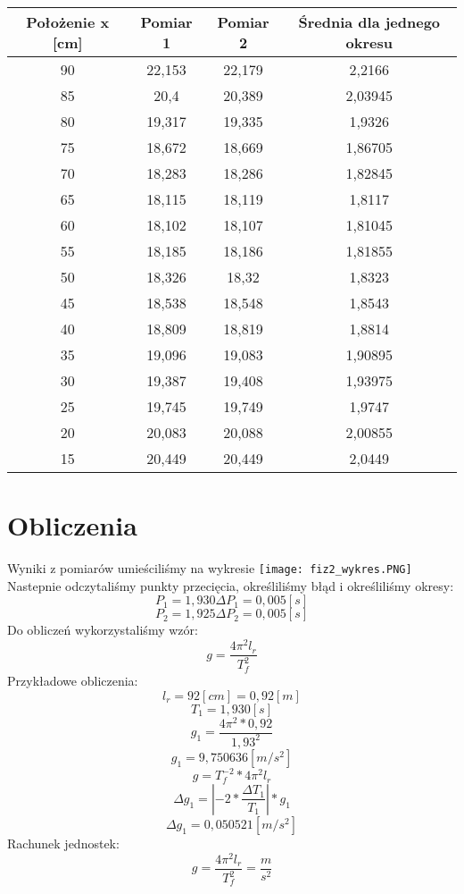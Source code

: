 \documentclass[polish,a4paper]{article}
\begin{document}
\begin{table}[H]
\centering
\begin{tabular}{|c|c|c|c|}
\hline
Położenie x [cm] & Pomiar 1 & Pomiar 2 & Średnia dla jednego okresu\\
\hline 
90 &	22,153 &	22,179 &	2,2166\\
85 &	20,4 &	20,389	 & 2,03945\\
80 &	19,317 &	19,335 &	1,9326\\
75 &	18,672 &	18,669 &	1,86705\\
70 &	18,283 &	18,286 &	1,82845\\
65 &	18,115 &	18,119 &	1,8117\\
60 &	18,102 &	18,107 &	1,81045\\
55 &	18,185 &	18,186 &	1,81855\\
50 &	18,326 &	18,32 &	1,8323\\
45 &	18,538 &	18,548 &	1,8543\\
40 &	18,809 &	18,819 &	1,8814\\
35 &	19,096 &	19,083 &	1,90895\\
30 &	19,387 &	19,408 &	1,93975\\
25 &	19,745 &	19,749 &	1,9747\\
20 &	20,083 &	20,088 &	2,00855\\
15 &	20,449 &	20,449 &	2,0449\\

\hline
\end{tabular}
\end{table}
\newpage

\section{Obliczenia}
Wyniki z pomiarów umieściliśmy na wykresie
\newline
\texttt{[image: fiz2\_wykres.PNG]}
Nastepnie odczytaliśmy punkty przecięcia, określiliśmy błąd i określiliśmy okresy:
\newline
$$P_{1} = 1,930  \Delta P_{1} = 0,005 [s] $$
$$P_{2} = 1,925  \Delta P_{2} = 0,005 [s] $$
\newline
Do obliczeń wykorzystaliśmy wzór:
$$ g = \frac{4\pi^2l_r}{T_f^2} $$
Przykładowe obliczenia:
$$l_r = 92 [cm] = 0,92 [m]$$
$$T_1 = 1,930 [s]$$
$$ g_1 = \frac{4\pi^2*0,92}{1,93^2} $$
$$g_{1} = 9,750636 [m/s^2]$$
$$g = T_f^{-2} * 4\pi^2l_r$$
$$\Delta g_1 = |-2 * \frac{\Delta T_1}{T_1} |*g_1 $$
$$\Delta g_1 = 0,050521 [m/s^{2}]$$
Rachunek jednostek:
$$ g = \frac{4\pi^2l_r}{T_f^2} = \frac{m}{s^2}$$
\end{document}
